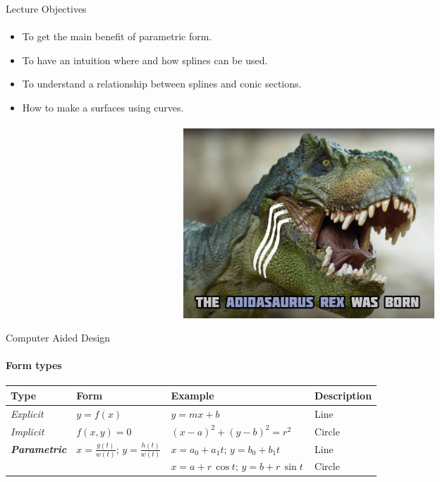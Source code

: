 \documentclass[aspectratio=169,notes]{beamer}
\begin{document}
\begin{frame}[t]{Lecture Objectives}
    \framesubtitle{}
    \begin{itemize}
        \item To get the main benefit of parametric form.
        \item To have an intuition where and how splines can be used.
        \item To understand a relationship between splines and conic sections.
        \item How to make a surfaces using curves.
    \end{itemize}
\end{frame}

\begin{frame}[t]{}
\framesubtitle{}
    \begin{figure}[H]
        \centering\includegraphics[height=7.1cm,width=1\textwidth,keepaspectratio]{adidasaurus.png}
        \label{fig:adidasaurus.png}
    \end{figure}
\end{frame}

\begin{frame}[t]{Computer Aided Design}
    \framesubtitle{Form types}
    \begin{table}[H]
        \centering
        \begin{tabular}{llll}
        \textbf{Type} & \textbf{Form} & \textbf{Example} & \textbf{Description} \\ 
        \hline
        \textit{Explicit} & $y=f(x)\,\!$ & $y=mx+b\,\!$ & Line \\
        \textit{Implicit} & $f(x,y)=0\,\!$ & $\left(x-a\right)^{2}+\left(y-b\right)^{2}=r^{2}$ & Circle \\
        \multirow{2}{*}{\textit{\textbf{Parametric}}} & \multirow{2}{*}{${\displaystyle x={\frac {g(t)}{w(t)}};\,\!} {\displaystyle y={\frac {h(t)}{w(t)}}}$} & $x=a_{0}+a_{1}t;\,\! {\displaystyle y=b_{0}+b_{1}t\,\!}$ & Line \\
         &  & $x=a+r\,\cos t;\,\! {\displaystyle y=b+r\,\sin t\,\!}$ & Circle
        \end{tabular}
        \end{table}
    \end{frame}
\end{document}
